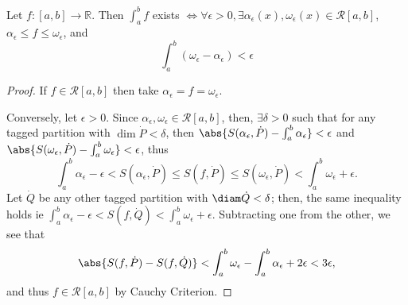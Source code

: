 \begin{theorem}
    Let $f:[a, b] \to \mathbb{R}$. Then $\int_a^b f$ exists $\iff \forall \epsilon > 0, \exists \alpha_\epsilon(x), \omega_\epsilon(x) \in \mathcal{R}[a, b]$, $\alpha_\epsilon \leq f \leq \omega_\epsilon$, and \[
    \int_a^b (\omega_\epsilon - \alpha_\epsilon) < \epsilon    
    \]
\end{theorem}
\begin{proof}
    If $f \in \mathcal{R}[a, b]$ then take $\alpha_\epsilon = f = \omega_\epsilon$. 
    
    Conversely, let $\epsilon > 0$. Since $\alpha_\epsilon, \omega_\epsilon \in \mathcal{R}[a, b]$, then, $\exists \delta > 0$ such that for any tagged partition with $\dim \dot{P} < \delta$, then $\abs{S(\alpha_\epsilon, \dot{P}) - \int_a^b \alpha_\epsilon} < \epsilon$ and $\abs{S(\omega_\epsilon, \dot{P}) - \int_a^b \omega_\epsilon} < \epsilon$, thus \[
    \int_a^b \alpha_\epsilon - \epsilon < S(\alpha_\epsilon, \dot{P}) \leq S(f, \dot{P})\leq S(\omega_\epsilon, \dot{P}) < \int_a^b \omega_\epsilon + \epsilon.    
    \]
    Let $\dot{Q}$ be any other tagged partition with $\diam \dot{Q} < \delta$; then, the same inequality holds ie $\int_a^b \alpha_\epsilon - \epsilon < S(f, \dot{Q}) < \int_a^b \omega_\epsilon + \epsilon$. Subtracting one from the other, we see that \begin{align*}
        \abs{S(f, \dot{P}) - S(f, \dot{Q})} < \int_a^b \omega_\epsilon - \int_a^b \alpha_\epsilon + 2 \epsilon < 3 \epsilon,
    \end{align*}
    and thus $f \in \mathcal{R}[a,b]$ by Cauchy Criterion.
\end{proof}